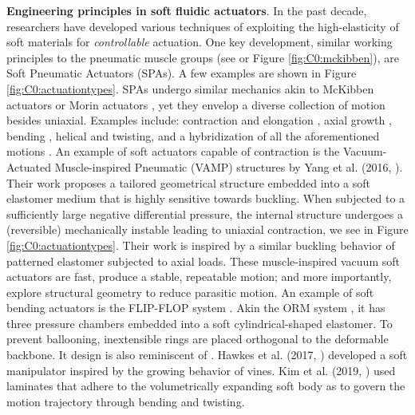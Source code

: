 \vspace{-4mm}
\textbf{Engineering principles in soft fluidic actuators}. In the past decade, researchers have developed various techniques of exploiting the high-elasticity of soft materials for \textit{controllable} actuation. One key development, similar working principles to the pneumatic muscle groups (see \cite{Mckibben,Morin1953} or Figure \ref{fig:C0:mckibben}), are Soft Pneumatic Actuators (SPAs). A few examples are shown in Figure \ref{fig:C0:actuationtypes}. SPAs undergo similar mechanics akin to McKibben actuators \cite{Mckibben} or Morin actuators \cite{Morin1953}, yet they envelop a diverse collection of motion besides uniaxial. Examples include: contraction and elongation \cite{Yang2016}, axial growth \cite{Hawkes2017}, bending \cite{Mosadegh2014,Galloway2016,Marchese2016}, helical and twisting, and a hybridization of all the aforementioned motions \cite{Kim2019Aug}. An example of soft actuators capable of contraction is the Vacuum-Actuated Muscle-inspired Pneumatic (VAMP) structures by Yang et al. (2016, \cite{Yang2016}). Their work proposes a tailored geometrical structure embedded into a soft elastomer medium that is highly sensitive towards buckling. When subjected to a sufficiently large negative differential pressure, the internal structure undergoes a (reversible) mechanically instable leading to uniaxial contraction, we see in Figure \ref{fig:C0:actuationtypes}. Their work is inspired by a similar buckling behavior of patterned elastomer \cite{Bertoldi2008,Mullin2007,Shim2013Aug} subjected to axial loads. These muscle-inspired vacuum soft actuators are fast, produce a stable, repeatable motion; and more importantly, explore structural geometry to reduce parasitic motion. An example of soft bending actuators is the FLIP-FLOP system \cite{Cianchetti2013Nov}. Akin the ORM system \cite{BibEntryOrm2019Sep}, it has three pressure chambers embedded into a soft cylindrical-shaped elastomer. To prevent ballooning, inextensible rings are placed orthogonal to the deformable backbone. It design is also reminiscent of \cite{Suzumori1992,Suzumori1991}. Hawkes et al. (2017, \cite{Hawkes2017}) developed a soft manipulator inspired by the growing behavior of vines. Kim et al. (2019, \cite{Kim2019Aug}) used laminates that adhere to the volumetrically expanding soft body as to govern the motion trajectory through bending and twisting.

